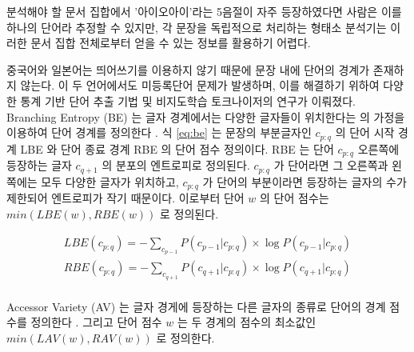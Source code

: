 \documentclass[oneside, ko,phd]{snuthesis_utf8_kor}
\begin{document}
\begin{table}[ht]
\centering
\caption{기학습된 한국어 형태소 분석기를 이용한 문장 분석 예시. (N: 명사, J: 조사, V: 동사, E: 어미, VCP: 동사형 전성어미)}
\label{tab:ioisentence_postagging_example}
\end{table}

분석해야 할 문서 집합에서 '아이오아이'라는 5음절이 자주 등장하였다면 사람은 이를 하나의 단어라 추정할 수 있지만, 각 문장을 독립적으로 처리하는 형태소 분석기는 이러한 문서 집합 전체로부터 얻을 수 있는 정보를 활용하기 어렵다.

중국어와 일본어는 띄어쓰기를 이용하지 않기 때문에 문장 내에 단어의 경계가 존재하지 않는다.
이 두 언어에서도 미등록단어 문제가 발생하며, 이를 해결하기 위하여 다양한 통계 기반 단어 추출 기법 및 비지도학습 토크나이저의 연구가 이뤄졌다.
Branching Entropy (BE) 는 글자 경계에서는 다양한 글자들이 위치한다는 \cite{harris1954distributional} 의 가정을 이용하여 단어 경계를 정의한다 \cite{jin2006unsupervised}.
식 \ref{eq:be} 는 문장의 부분글자인 $c_{p:q}$ 의 단어 시작 경계 LBE 와 단어 종료 경계 RBE 의 단어 점수 정의이다.
RBE 는 단어 $c_{p:q}$ 오른쪽에 등장하는 글자 $c_{q+1}$ 의 분포의 엔트로피로 정의된다.
$c_{p:q}$ 가 단어라면 그 오른쪽과 왼쪽에는 모두 다양한 글자가 위치하고, $c_{p:q}$ 가 단어의 부분이라면 등장하는 글자의 수가 제한되어 엔트로피가 작기 때문이다.
이로부터 단어 $w$ 의 단어 점수는 $min(LBE(w), RBE(w))$ 로 정의된다.

\begin{equation}
\label{eq:be}
\begin{aligned}
LBE(c_{p:q}) = - \sum_{c_{p-1}} P(c_{p-1} \vert c_{p:q}) \times \log P(c_{p-1} \vert c_{p:q}) \\
RBE(c_{p:q}) = - \sum_{c_{q+1}} P(c_{q+1} \vert c_{p:q}) \times \log P(c_{q+1} \vert c_{p:q}) \\
\end{aligned}
\end{equation}

Accessor Variety (AV) 는 글자 경게에 등장하는 다른 글자의 종류로 단어의 경계 점수를 정의한다 \cite{feng2004accessor}.
그리고 단어 점수 $w$ 는 두 경계의 점수의 최소값인 $min(LAV(w), RAV(w))$ 로 정의한다.
\end{document}
